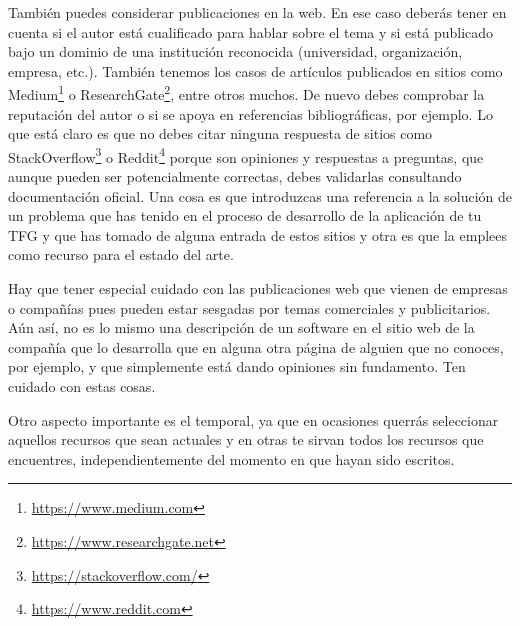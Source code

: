 
También puedes considerar publicaciones en la web. En ese caso deberás tener en cuenta si el autor está cualificado para hablar sobre el tema y si está publicado bajo un dominio de una institución reconocida (universidad, organización, empresa, etc.). También tenemos los casos de artículos publicados en sitios como {Medium}\footnote{\url{https://www.medium.com}} o {ResearchGate}\footnote{\url{https://www.researchgate.net}}, entre otros muchos. De nuevo debes comprobar la reputación del autor o si se apoya en referencias bibliográficas, por ejemplo. Lo que está claro es que no debes citar ninguna respuesta de sitios como {StackOverflow}\footnote{\url{https://stackoverflow.com/}} o {Reddit}\footnote{\url{https://www.reddit.com}} porque son opiniones y respuestas a preguntas, que aunque pueden ser potencialmente correctas, debes validarlas consultando documentación oficial. Una cosa es que introduzcas una referencia a la solución de un problema que has tenido en el proceso de desarrollo de la aplicación de tu TFG y que has tomado de alguna entrada de estos sitios y otra es que la emplees como recurso para el estado del arte.

Hay que tener especial cuidado con las publicaciones web que vienen de empresas o compañías pues pueden estar sesgadas por temas comerciales y publicitarios. Aún así, no es lo mismo una descripción de un software en el sitio web de la compañía que lo desarrolla que en alguna otra página de alguien que no conoces, por ejemplo, y que simplemente está dando opiniones sin fundamento. Ten cuidado con estas cosas.  

Otro aspecto importante es el temporal, ya que en ocasiones querrás seleccionar aquellos recursos que sean actuales y en otras te sirvan todos los recursos que encuentres, independientemente del momento en que hayan sido escritos. 

